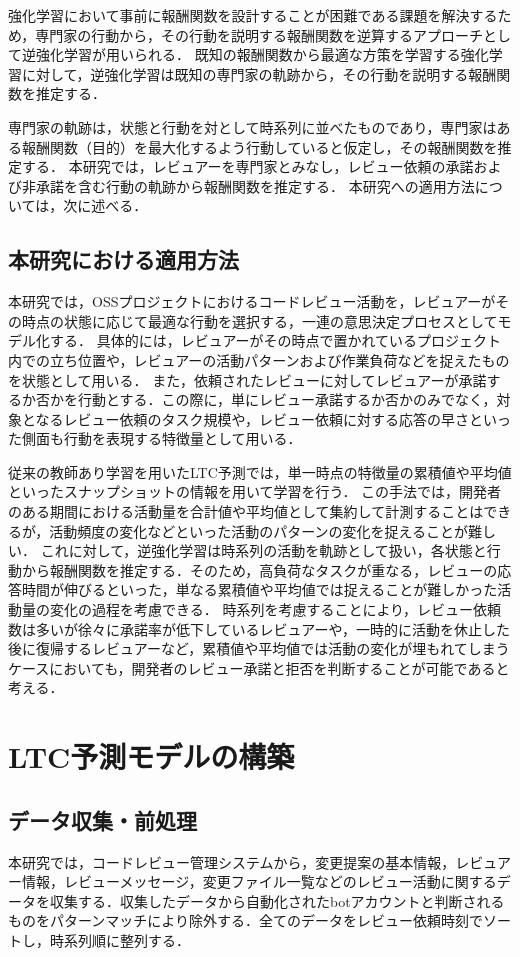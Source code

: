\documentclass[11pt]{jreport}
\begin{document}
強化学習において事前に報酬関数を設計することが困難である課題を解決するため，専門家の行動から，その行動を説明する報酬関数を逆算するアプローチとして逆強化学習が用いられる\cite{IRL}．
既知の報酬関数から最適な方策を学習する強化学習に対して，逆強化学習は既知の専門家の軌跡から，その行動を説明する報酬関数を推定する．

専門家の軌跡は，状態と行動を対として時系列に並べたものであり，専門家はある報酬関数（目的）を最大化するよう行動していると仮定し，その報酬関数を推定する．
本研究では，レビュアーを専門家とみなし，レビュー依頼の承諾および非承諾を含む行動の軌跡から報酬関数を推定する．
本研究への適用方法については，次に述べる．

\section{本研究における適用方法}
本研究では，OSSプロジェクトにおけるコードレビュー活動を，レビュアーがその時点の状態に応じて最適な行動を選択する，一連の意思決定プロセスとしてモデル化する．
具体的には，レビュアーがその時点で置かれているプロジェクト内での立ち位置や，レビュアーの活動パターンおよび作業負荷などを捉えたものを状態として用いる．
また，依頼されたレビューに対してレビュアーが承諾するか否かを行動とする．この際に，単にレビュー承諾するか否かのみでなく，対象となるレビュー依頼のタスク規模や，レビュー依頼に対する応答の早さといった側面も行動を表現する特徴量として用いる．

従来の教師あり学習を用いたLTC予測では，単一時点の特徴量の累積値や平均値といったスナップショットの情報を用いて学習を行う．
この手法では，開発者のある期間における活動量を合計値や平均値として集約して計測することはできるが，活動頻度の変化などといった活動のパターンの変化を捉えることが難しい．
これに対して，逆強化学習は時系列の活動を軌跡として扱い，各状態と行動から報酬関数を推定する．そのため，高負荷なタスクが重なる，レビューの応答時間が伸びるといった，単なる累積値や平均値では捉えることが難しかった活動量の変化の過程を考慮できる．
時系列を考慮することにより，レビュー依頼数は多いが徐々に承諾率が低下しているレビュアーや，一時的に活動を休止した後に復帰するレビュアーなど，累積値や平均値では活動の変化が埋もれてしまうケースにおいても，開発者のレビュー承諾と拒否を判断することが可能であると考える．


\chapter{LTC予測モデルの構築}
\label{sec:model}
\section{データ収集・前処理}
本研究では，コードレビュー管理システムから，変更提案の基本情報，レビュアー情報，レビューメッセージ，変更ファイル一覧などのレビュー活動に関するデータを収集する．収集したデータから自動化されたbotアカウントと判断されるものをパターンマッチにより除外する．全てのデータをレビュー依頼時刻でソートし，時系列順に整列する．
\end{document}
